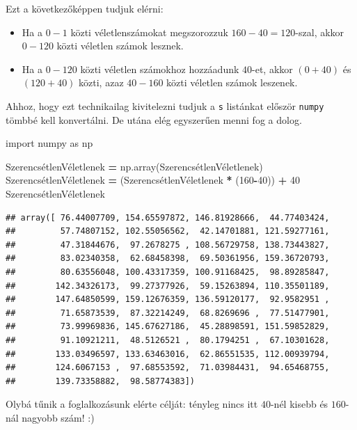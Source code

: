 \documentclass[
]{book}
\newenvironment{Shaded}{\begin{snugshade}}{\end{snugshade}}
\newcommand{\DecValTok}[1]{\textcolor[rgb]{0.00,0.00,0.81}{#1}}
\newcommand{\ImportTok}[1]{#1}
\newcommand{\NormalTok}[1]{#1}
\newcommand{\OperatorTok}[1]{\textcolor[rgb]{0.81,0.36,0.00}{\textbf{#1}}}
\providecommand{\tightlist}{%
  \setlength{\itemsep}{0pt}\setlength{\parskip}{0pt}}
\begin{document}
Ezt a következőképpen tudjuk elérni:

\begin{itemize}
\tightlist
\item
  Ha a \(0-1\) közti véletlenszámokat megszorozzuk \(160-40=120\)-szal, akkor \(0-120\) közti véletlen számok lesznek.
\item
  Ha a \(0-120\) közti véletlen számokhoz hozzáadunk \(40\)-et, akkor \((0+40)\) és \((120+40)\) közti, azaz \(40-160\) közti véletlen számok leszenek.
\end{itemize}

Ahhoz, hogy ezt technikailag kivitelezni tudjuk a \texttt{s} listánkat először \texttt{numpy} tömbbé kell konvertálni. De utána elég egyszerűen menni fog a dolog.

\begin{Shaded}
\begin{Highlighting}[]
\ImportTok{import}\NormalTok{ numpy }\ImportTok{as}\NormalTok{ np}

\NormalTok{SzerencsétlenVéletlenek }\OperatorTok{=}\NormalTok{ np.array(SzerencsétlenVéletlenek)}
\NormalTok{SzerencsétlenVéletlenek }\OperatorTok{=}\NormalTok{ (SzerencsétlenVéletlenek }\OperatorTok{*}\NormalTok{ (}\DecValTok{160}\OperatorTok{{-}}\DecValTok{40}\NormalTok{)) }\OperatorTok{+} \DecValTok{40}
\NormalTok{SzerencsétlenVéletlenek}
\end{Highlighting}
\end{Shaded}

\begin{verbatim}
## array([ 76.44007709, 154.65597872, 146.81928666,  44.77403424,
##         57.74807152, 102.55056562,  42.14701881, 121.59277161,
##         47.31844676,  97.2678275 , 108.56729758, 138.73443827,
##         83.02340358,  62.68458398,  69.50361956, 159.36720793,
##         80.63556048, 100.43317359, 100.91168425,  98.89285847,
##        142.34326173,  99.27377926,  59.15263894, 110.35501189,
##        147.64850599, 159.12676359, 136.59120177,  92.9582951 ,
##         71.65873539,  87.32214249,  68.8269696 ,  77.51477901,
##         73.99969836, 145.67627186,  45.28898591, 151.59852829,
##         91.10921211,  48.5126521 ,  80.1794251 ,  67.10301628,
##        133.03496597, 133.63463016,  62.86551535, 112.00939794,
##        124.6067153 ,  97.68553592,  71.03984431,  94.65468755,
##        139.73358882,  98.58774383])
\end{verbatim}

Olybá tűnik a foglalkozásunk elérte célját: tényleg nincs itt \(40\)-nél kisebb és \(160\)-nál nagyobb szám! :)
\end{document}
